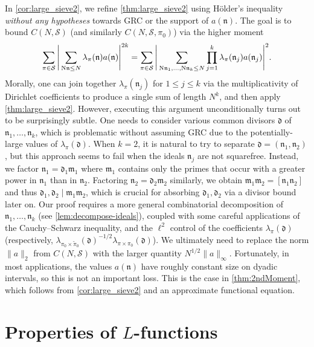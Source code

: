 \documentclass[11pt]{amsart}
\theoremstyle{remark}
\numberwithin{equation}{section}
\newcommand{\kd}{\mathfrak{d}}
\newcommand{\km}{\mathfrak{m}}
\newcommand{\kn}{\mathfrak{n}}
\newcommand{\N}{\textnormal{N}}
\newcommand{\mS}{\mathcal{S}}
\renewcommand{\tilde}{\widetilde}
\begin{document}
In \cref{cor:large_sieve2}, we refine \cref{thm:large_sieve2} using H{\"o}lder's inequality {\it without any hypotheses} towards GRC or the support of $a(\kn)$. The goal is to bound $C(N,\mS)$ (and similarly $C(N,\mS,\pi_0)$) via the higher moment
\[
    \sum_{\pi \in \mS} \Bigg\vert \sum_{\N\kn \le N} \lambda_\pi(\kn) a(\kn) \Bigg\vert^{2k}
    =
    \sum_{\pi \in \mS} \Bigg\vert \sum_{\N\kn_1, \ldots, \N\kn_k \le N} \prod_{j=1}^k \lambda_\pi(\kn_j) a(\kn_j) \Bigg\vert^2.
\]
Morally, one can join together $\lambda_\pi(\kn_j)$ for $1 \le j \le k$ via the multiplicativity of Dirichlet coefficients to produce a single sum of length $N^k$, and then apply \cref{thm:large_sieve2}. However, executing this argument unconditionally turns out to be surprisingly subtle. One needs to consider various common divisors $\kd$ of $\kn_1, \ldots, \kn_k$, which is problematic without assuming GRC due to the potentially-large values of $\lambda_{\pi}(\kd)$. 
When $k = 2$, it is natural to try to separate $\kd = (\kn_1, \kn_2)$, but this approach seems to fail when the ideals $\kn_j$ are not squarefree. Instead, we factor $\kn_1 = \kd_1 \km_1$ where $\km_1$ contains only the primes that occur with a greater power in $\kn_1$ than in $\kn_2$. Factoring $\kn_2 = \kd_2 \km_2$ similarly, we obtain $\km_1\km_2 = [\kn_1\kn_2]$ and thus $\kd_1, \kd_2 \mid \km_1\km_2$, which is crucial for absorbing $\kd_1, \kd_2$ via a divisor bound later on. Our proof requires a more general combinatorial decomposition of $\kn_1, \ldots, \kn_k$ (see \cref{lem:decompose-ideals}), coupled with some careful applications of the Cauchy--Schwarz inequality, and the $\ell^2$ control of the coefficients $\lambda_\pi(\kd)$ (respectively, $\lambda_{\pi_0 \times \tilde\pi_0}(\kd)^{-1/2} \lambda_{\pi \times \pi_0}(\kd)$). We ultimately need to replace the norm $\|a\|_2$ from $C(N,\mS)$ with the larger quantity $N^{1/2}\|a\|_\infty$.  Fortunately, in most applications, the values $a(\kn)$ have roughly constant size on dyadic intervals, so this is not an important loss. This is the case in \cref{thm:2ndMoment}, which follows from \cref{cor:large_sieve2} and an approximate functional equation.





\section{Properties of \texorpdfstring{$L$}{L}-functions}
\label{sec:L-functions}


\end{document}
